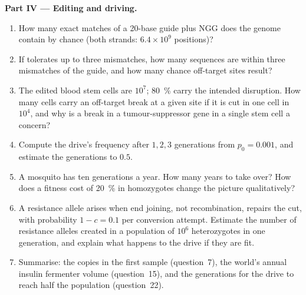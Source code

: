 \begin{problem}
\medskip
\noindent\textbf{Part IV --- Editing and driving.}
\begin{enumerate}[resume]
  \item How many exact matches of a 20-base guide plus NGG does the
        genome contain by chance (both strands: $6.4\times 10^{9}$
        positions)?
  \item If  tolerates up to three mismatches, how many sequences
        are within three mismatches of the guide, and how many chance
        off-target sites result?
  \item The edited blood stem cells are $10^{7}$; \qty{80}{\%} carry
        the intended disruption. How many cells carry an off-target
        break at a given site if it is cut in one cell in $10^{4}$,
        and why is a break in a tumour-suppressor gene in a single
        stem cell a concern?
  \item Compute the drive's frequency after $1, 2, 3$ generations from
        $p_{0} = 0.001$, and estimate the generations to $0.5$.
  \item A mosquito has ten generations a year. How many years to take
        over? How does a fitness cost of \qty{20}{\%} in homozygotes
        change the picture qualitatively?
  \item A resistance allele arises when end joining, not recombination,
        repairs the cut, with probability $1 - c = 0.1$ per conversion
        attempt. Estimate the number of resistance alleles created in
        a population of $10^{6}$ heterozygotes in one generation, and
        explain what happens to the drive if they are fit.
  \item Summarise: the copies in the first sample (question~7), the
        world's annual insulin fermenter volume (question~15), and the
        generations for the drive to reach half the population
        (question~22).
\end{enumerate}
\end{problem}
